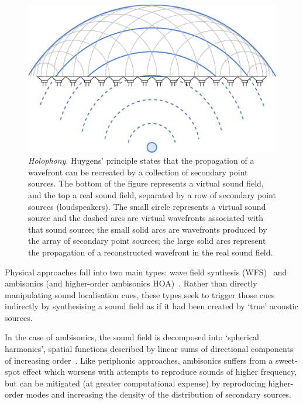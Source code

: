 \documentclass[utf8]{FrontiersinHarvard}
\begin{document}
    \begin{figure}[ht]
        \centering
        \includegraphics[width=.75\textwidth]{figures/wfs_1}
        \caption{\textit{Holophony}.
        Huygens' principle states that the propagation of a wavefront
        can be recreated by a collection of secondary point sources.
        The bottom of the figure represents a virtual sound field, and the top a
        real sound field, separated by a row of secondary point sources
            (loudspeakers).
            The small circle represents a virtual sound source and the dashed arcs
            are virtual wavefronts associated with that sound source;
            the small solid arcs are wavefronts produced by the array of secondary
            point sources;
            the large solid arcs represent the propagation of a reconstructed
            wavefront in the real sound field.}
        \label{fig:wfs_1}
    \end{figure}

    Physical approaches fall into two main types: wave field synthesis
    (WFS)~\citep{berkhout_acoustic_1993} and
    ambisonics (and higher-order ambisonics \textemdash{}
    HOA)~\citep{frank_producing_2015}.
    Rather than directly manipulating sound localisation cues, these types seek to
    trigger those cues indirectly by synthesising a sound field as if it had been
    created by `true' acoustic sources.

    In the case of ambisonics, the sound field is decomposed into `spherical
    harmonics', spatial functions described by linear sums of directional
    components of increasing order~\citep{nicol_sound_2017}.
    Like periphonic approaches, ambisonics suffers from a sweet-spot effect
    which worsens with attempts to reproduce sounds of higher frequency, but can
    be mitigated (at greater computational expense) by reproducing higher-order
    modes and increasing the density of the distribution of secondary sources.
\end{document}
